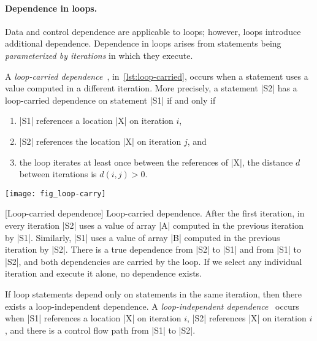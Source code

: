 \paragraph*{Dependence in loops.}
Data and control dependence are applicable to loops;
however, loops introduce additional dependence.
Dependence in loops arises from statements being \emph{parameterized by iterations} in which they execute.

A \emph{loop-carried dependence}~\cite[p. 73]{kennedy2001}, in~\autoref{lst:loop-carried},
occurs when a statement uses a value computed in a different iteration.
More precisely, a statement \pr|S2| has a loop-carried dependence on statement \pr|S1| if and only if
\begin{enumerate}
\item \pr|S1| references a location \pr|X| on iteration \(i\),
\item \pr|S2| references the location \pr|X| on iteration \(j\), and
\item the loop iterates at least once between the references of \pr|X|, \ie the distance \(d\) between iterations is \(d(i, j) > 0\).
\end{enumerate}

\begin{center}
\captionsetup{type=lstlisting}
\begin{minipage}{.4\textwidth}
\end{minipage}%
\hfill%
\begin{minipage}{.5\textwidth}
{\centering\texttt{[image: fig\_loop-carry]}}
\end{minipage}
[Loop-carried dependence]{
Loop-carried dependence.
After the first iteration, in every iteration \pr|S2| uses a value of array \pr|A| computed in the previous iteration by \pr|S1|.
Similarly, \pr|S1| uses a value of array \pr|B| computed in the previous iteration by \pr|S2|.
There is a true dependence from \pr|S2| to \pr|S1| and from \pr|S1| to \pr|S2|, and both dependencies are carried by the loop.
If we select any individual iteration and execute it alone, no dependence exists.
}\label{lst:loop-carried}
\end{center}

If loop statements depend only on statements in the {same iteration}, then there exists a loop-independent dependence.
A \emph{loop-independent dependence}~\cite[p. 76]{kennedy2001} occurs when
\pr|S1| references a location \pr|X| on iteration \(i\),
\pr|S2| references \pr|X| on iteration \(i\),
and there is a control flow path from \pr|S1| to \pr|S2|.

